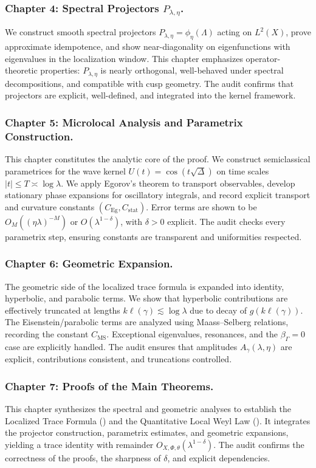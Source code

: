 \subsubsection*{Chapter 4: Spectral Projectors $P_{\lambda,\eta}$.}
We construct smooth spectral projectors $P_{\lambda,\eta}=\phi_\eta(\Lambda)$ acting on $L^2(X)$,
prove approximate idempotence, and show near-diagonality on eigenfunctions with eigenvalues in the localization window.
This chapter emphasizes operator-theoretic properties: $P_{\lambda,\eta}$ is nearly orthogonal,
well-behaved under spectral decompositions, and compatible with cusp geometry.
The audit confirms that projectors are explicit, well-defined, and integrated into the kernel framework.

\subsubsection*{Chapter 5: Microlocal Analysis and Parametrix Construction.}
This chapter constitutes the analytic core of the proof.
We construct semiclassical parametrices for the wave kernel $U(t)=\cos(t\sqrt{\Delta})$ on time scales $|t|\le T\asymp\log\lambda$.
We apply Egorov’s theorem to transport observables, develop stationary phase expansions for oscillatory integrals,
and record explicit transport and curvature constants $(C_{\mathrm{Eg}},C_{\mathrm{stat}})$.
Error terms are shown to be $O_M((\eta\lambda)^{-M})$ or $O(\lambda^{1-\delta})$, with $\delta>0$ explicit.
The audit checks every parametrix step, ensuring constants are transparent and uniformities respected.

\subsubsection*{Chapter 6: Geometric Expansion.}
The geometric side of the localized trace formula is expanded into identity, hyperbolic, and parabolic terms.
We show that hyperbolic contributions are effectively truncated at lengths $k\ell(\gamma)\lesssim \log\lambda$
due to decay of $g(k\ell(\gamma))$. The Eisenstein/parabolic terms are analyzed using Maass–Selberg relations,
recording the constant $C_{\mathrm{MS}}$. Exceptional eigenvalues, resonances, and the $\beta_\Gamma=0$ case are explicitly handled.
The audit ensures that amplitudes $A_\gamma(\lambda,\eta)$ are explicit, contributions consistent, and truncations controlled.

\subsubsection*{Chapter 7: Proofs of the Main Theorems.}
This chapter synthesizes the spectral and geometric analyses to establish
the Localized Trace Formula () and the Quantitative Local Weyl Law ().
It integrates the projector construction, parametrix estimates, and geometric expansions,
yielding a trace identity with remainder $O_{X,\Phi,\theta}(\lambda^{1-\delta})$.
The audit confirms the correctness of the proofs, the sharpness of $\delta$, and explicit dependencies.

